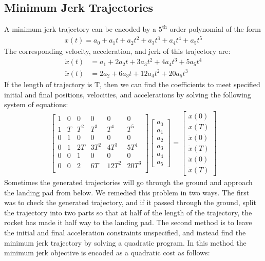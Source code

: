 \documentclass{article}
\begin{document}
\subsection{Minimum Jerk Trajectories}
A minimum jerk trajectory can be encoded by a $5^{\textrm{th}}$ order polynomial of the form
\begin{align}
    x(t) = a_0 + a_1 t + a_2 t^2 + a_3 t^3 + a_4 t^4 + a_5 t^5
\end{align}
The corresponding velocity, acceleration, and jerk of this trajectory are:
\begin{align}
     \dot{x}(t) &= a_1 + 2 a_2 t + 3 a_3 t^2 + 4 a_4 t^3 + 5 a_5 t^4 \\
    \ddot{x}(t) &= 2 a_2 + 6 a_3 t + 12 a_4 t^2 + 20 a_5 t^3
\end{align}
If the length of trajectory is T, then we can find the coefficients to meet
specified initial and final positions, velocities, and accelerations by solving
the following system of equations:
\begin{align}
    \begin{bmatrix} 1 & 0 &   0 &    0 &     0 &     0 \\
                    1 & T & T^2 &  T^3 &   T^4 &   T^5 \\
                    0 & 1 &   0 &    0 &     0 &     0 \\
                    0 & 1 &  2T & 3T^2 &  4T^3 &  5T^4 \\
                    0 & 0 &   1 &    0 &     0 &     0 \\
                    0 & 0 &   2 &   6T & 12T^2 & 20T^3 \\
    \end{bmatrix} 
    \begin{bmatrix} a_0 \\ a_1 \\ a_2 \\ a_3 \\a_4 \\ a_5 \end{bmatrix} =
    \begin{bmatrix} x(0) \\ x(T) \\ \dot{x}(0) \\ \dot{x}(T) \\ \ddot{x}(0) \\ \ddot{x}(T) \end{bmatrix}
\end{align}
Sometimes the generated trajectories will go through the ground and approach
the landing pad from below.  We remedied this problem in two ways. The first
was to check the generated trajectory, and if it passed through the ground,
split the trajectory into two parts so that at half of the length of the
trajectory, the rocket has made it half way to the landing pad. The second
method is to leave the initial and final acceleration constraints unspecified, 
and instead find the minimum jerk trajectory by solving a quadratic program. In this method
the minimum jerk objective is encoded as a quadratic cost as follows:
\end{document}
